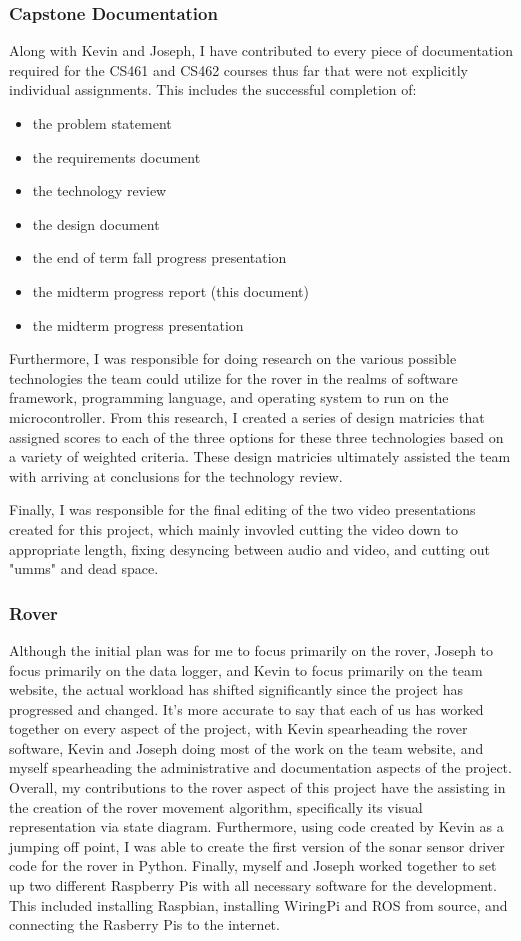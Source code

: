 \documentclass[onecolumn, draftclsnofoot,10pt, compsoc]{IEEEtran}
\begin{document}
\subsubsection{Capstone Documentation}
Along with Kevin and Joseph, I have contributed to every piece of documentation required for the CS461 and CS462 courses thus far that were not explicitly individual assignments. This includes the successful completion of:
\begin{itemize}
\item the problem statement
\item the requirements document
\item the technology review
\item the design document
\item the end of term fall progress presentation
\item the midterm progress report (this document)
\item the midterm progress presentation
\end{itemize}

Furthermore, I was responsible for doing research on the various possible technologies the team could utilize for the rover in the realms of software framework, programming language, and operating system to run on the microcontroller. From this research, I created a series of design matricies that assigned scores to each of the three options for these three technologies based on a variety of weighted criteria. These design matricies ultimately assisted the team with arriving at conclusions for the technology review.

Finally, I was responsible for the final editing of the two video presentations created for this project, which mainly invovled cutting the video down to appropriate length, fixing desyncing between audio and video, and cutting out "umms" and dead space. 

\subsubsection{Rover}
Although the initial plan was for me to focus primarily on the rover, Joseph to focus primarily on the data logger, and Kevin to focus primarily on the team website, the actual workload has shifted significantly since the project has progressed and changed. It's more accurate to say that each of us has worked together on every aspect of the project, with Kevin spearheading the rover software, Kevin and Joseph doing most of the work on the team website, and myself spearheading the administrative and documentation aspects of the project. Overall, my contributions to the rover aspect of this project have the assisting in the creation of the rover movement algorithm, specifically its visual representation via state diagram. Furthermore, using code created by Kevin as a jumping off point, I was able to create the first version of the sonar sensor driver code for the rover in Python. Finally, myself and Joseph worked together to set up two different Raspberry Pis with all necessary software for the development. This included installing Raspbian, installing WiringPi and ROS from source, and connecting the Rasberry Pis to the internet.
\end{document}
